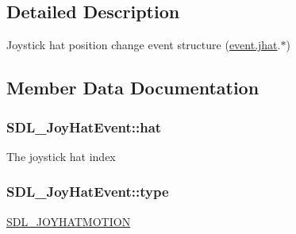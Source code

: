 \subsection{Detailed Description}
Joystick hat position change event structure (\hyperlink{unionSDL__Event_a421b40e0f8e01f181c8d5548cff1dd1d}{event.\+jhat}.$\ast$) 

\subsection{Member Data Documentation}
\hypertarget{structSDL__JoyHatEvent_ab1b54a6d1091e583e856f86b5af1e2f6}{}
\subsubsection[{hat}]{ S\+D\+L\+\_\+\+Joy\+Hat\+Event\+::hat}\label{structSDL__JoyHatEvent_ab1b54a6d1091e583e856f86b5af1e2f6}
The joystick hat index \hypertarget{structSDL__JoyHatEvent_ac583dafab46c44354e210a542aff57cc}{}
\subsubsection[{type}]{ S\+D\+L\+\_\+\+Joy\+Hat\+Event\+::type}\label{structSDL__JoyHatEvent_ac583dafab46c44354e210a542aff57cc}
\hyperlink{SDL__events_8h_a3b589e89be6b35c02e0dd34a55f3fccaafba4080bfbad335e520097b2024f0dff}{S\+D\+L\+\_\+\+J\+O\+Y\+H\+A\+T\+M\+O\+T\+I\+O\+N} \hypertarget{structSDL__JoyHatEvent_a52b179a34407449941b61d988ca72ef4}{}
